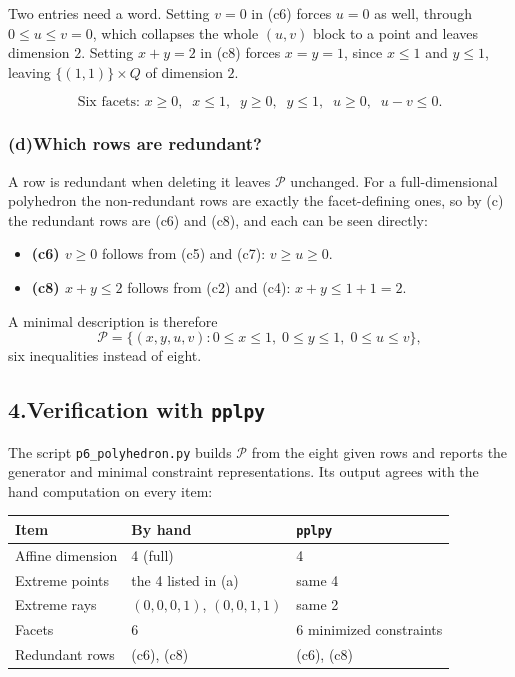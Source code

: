 \documentclass[11pt]{article}
\theoremstyle{definition}
\theoremstyle{plain}
\begin{document}
Two entries need a word. Setting $v = 0$ in (c6) forces $u = 0$ as well,
through $0 \le u \le v = 0$, which collapses the whole $(u,v)$ block to a
point and leaves dimension $2$. Setting $x + y = 2$ in (c8) forces
$x = y = 1$, since $x \le 1$ and $y \le 1$, leaving $\{(1,1)\} \times Q$
of dimension $2$.

\[
  \boxed{\;
  \text{Six facets: } x \ge 0,\;\; x \le 1,\;\; y \ge 0,\;\;
  y \le 1,\;\; u \ge 0,\;\; u - v \le 0. \;}
\]

\subsubsection*{(d)\quad Which rows are redundant?}

A row is redundant when deleting it leaves $\mathcal{P}$ unchanged. For
a full-dimensional polyhedron the non-redundant rows are exactly the
facet-defining ones, so by (c) the redundant rows are (c6) and (c8), and
each can be seen directly:

\begin{itemize}
  \item \textbf{(c6) $v \ge 0$} follows from (c5) and (c7):
        $v \ge u \ge 0$.
  \item \textbf{(c8) $x + y \le 2$} follows from (c2) and (c4):
        $x + y \le 1 + 1 = 2$.
\end{itemize}

A minimal description is therefore
\[
  \mathcal{P} = \big\{ (x,y,u,v) :
    0 \le x \le 1,\; 0 \le y \le 1,\; 0 \le u \le v \big\},
\]
six inequalities instead of eight.

\subsection*{4.\quad Verification with \texttt{pplpy}}

The script \texttt{p6\_polyhedron.py} builds $\mathcal{P}$ from the
eight given rows and reports the generator and minimal constraint
representations. Its output agrees with the hand computation on every
item:

\begin{center}
\begin{tabular}{@{}lll@{}}
\toprule
Item & By hand & \texttt{pplpy} \\
\midrule
Affine dimension & 4 (full) & 4 \\
Extreme points & the 4 listed in (a) & same 4 \\
Extreme rays & $(0,0,0,1)$, $(0,0,1,1)$ & same 2 \\
Facets & 6 & 6 minimized constraints \\
Redundant rows & (c6), (c8) & (c6), (c8) \\
\bottomrule
\end{tabular}
\end{center}
\end{document}
